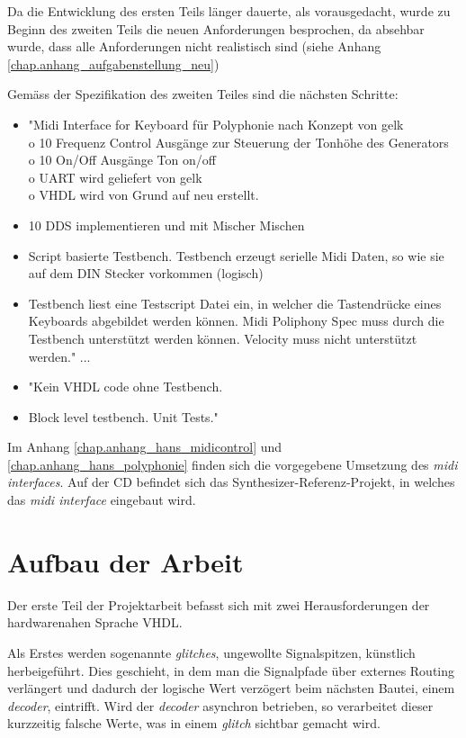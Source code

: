 Da die Entwicklung des ersten Teils länger dauerte, als vorausgedacht, wurde zu Beginn des zweiten Teils die neuen Anforderungen besprochen, da absehbar wurde, dass alle Anforderungen nicht realistisch sind (siehe Anhang \ref{chap.anhang_aufgabenstellung_neu}) 

Gemäss der Spezifikation des zweiten Teiles sind die nächsten Schritte:
\begin{itemize}
\item "Midi Interface for Keyboard für Polyphonie nach Konzept von gelk\\
o   10 Frequenz Control Ausgänge zur Steuerung der Tonhöhe des Generators\\
o   10 On/Off Ausgänge Ton on/off\\
o   UART wird geliefert von gelk\\
o   VHDL wird von Grund auf neu erstellt.
\item 10 DDS implementieren und mit Mischer Mischen
\item Script basierte Testbench. Testbench erzeugt serielle Midi Daten, so wie sie auf dem DIN Stecker vorkommen (logisch)
\item Testbench liest eine Testscript Datei ein, in welcher die Tastendrücke eines Keyboards abgebildet werden können. Midi Poliphony Spec muss durch die Testbench unterstützt werden können. Velocity muss nicht unterstützt werden."
...
\item "Kein VHDL code ohne Testbench.
\item Block level testbench. Unit Tests."
\end{itemize}
\bigskip

Im Anhang \ref{chap.anhang_hans_midicontrol} und \ref{chap.anhang_hans_polyphonie} finden sich die vorgegebene Umsetzung des \textit{midi interfaces}. Auf der CD befindet sich das Synthesizer-Referenz-Projekt, in welches das \textit{midi interface} eingebaut wird.

\section{Aufbau der Arbeit}\label{sect.einleitung_aufbau}
Der erste Teil der Projektarbeit befasst sich mit zwei Herausforderungen der hardwarenahen Sprache VHDL. 

Als Erstes werden sogenannte \textit{glitches}, ungewollte Signalspitzen, künstlich herbeigeführt. Dies geschieht, in dem man die Signalpfade über externes Routing verlängert und dadurch der logische Wert verzögert beim nächsten Bautei, einem \textit{decoder}, eintrifft. Wird der \textit{decoder} asynchron betrieben, so verarbeitet dieser kurzzeitig falsche Werte, was in einem \textit{glitch} sichtbar gemacht wird. 

